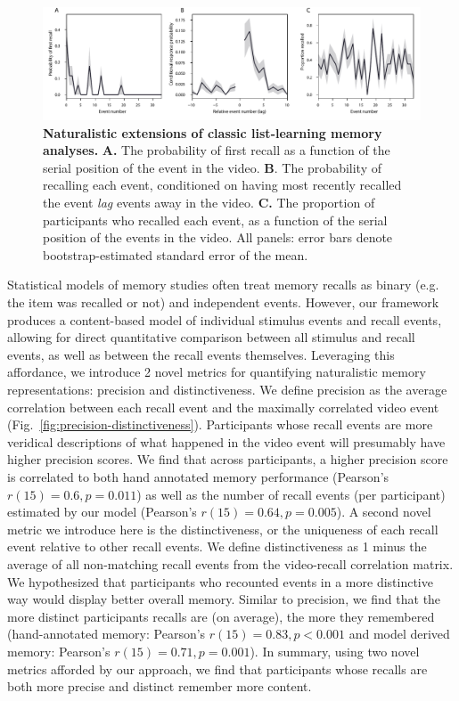 \documentclass{article}
\begin{document}
\begin{figure}[tp]
  \centering
  \includegraphics[width=1\textwidth]{figs/list_learning}
  \caption{\small \textbf{Naturalistic extensions of classic list-learning memory analyses.} \textbf{A.} The probability of first recall as a function of the serial position of the event in the video. \textbf{B}.  The probability of recalling each event, conditioned on having most recently recalled the event \textit{lag} events away in the video.  \textbf{C.} The proportion of participants who recalled each event, as a function of the serial position of the events in the video.  All panels: error bars denote bootstrap-estimated standard error of the mean.}
  \label{fig:list-learning}
\end{figure}

Statistical models of memory studies often treat memory recalls as binary (e.g. the item was recalled or not) and independent events.  However, our framework produces a content-based model of individual stimulus events and recall events, allowing for direct quantitative comparison between all stimulus and recall events, as well as between the recall events themselves.  Leveraging this affordance, we introduce 2 novel metrics for quantifying naturalistic memory representations: precision and distinctiveness.  We define precision as the average correlation between each recall event and the maximally correlated video event (Fig.~\ref{fig:precision-distinctiveness}).  Participants whose recall events are more veridical descriptions of what happened in the video event will presumably have higher precision scores. We find that across participants, a higher precision score is correlated to both hand annotated memory performance (Pearson's $r(15) = 0.6, p = 0.011$) as well as the number of recall events (per participant) estimated by our model (Pearson's $r(15) = 0.64, p = 0.005$). A second novel metric we introduce here is the distinctiveness, or the uniqueness of each recall event relative to other recall events. We define distinctiveness as 1 minus the average of all non-matching recall events from the video-recall correlation matrix. We hypothesized that participants who recounted events in a more distinctive way would display better overall memory.  Similar to precision, we find that the more distinct participants recalls are (on average), the more they remembered (hand-annotated memory: Pearson's $r(15) = 0.83, p < 0.001$ and model derived memory: Pearson's $r(15) = 0.71, p = 0.001$).  In summary, using two novel metrics afforded by our approach, we find that participants whose recalls are both more precise and distinct remember more content.
\end{document}
